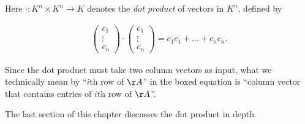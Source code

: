 \begin{theorem}
    Here $\cdot:K^n \times K^n \rightarrow K$ denotes the \textit{dot product} of vectors in $K^n$, defined by
    
    \begin{align*}
        \begin{pmatrix} c_1 \\ \vdots \\ c_n \end{pmatrix}
        \cdot
        \begin{pmatrix} c_1 \\ \vdots \\ c_n \end{pmatrix}
        =
        c_1 c_1 + ... + c_n c_n.
    \end{align*}
    
    Since the dot product must take two column vectors as input, what we technically mean by ``$i$th row of $\AA$'' in the boxed equation is ``column vector that contains entries of $i$th row of $\AA$''.
    
    The last section of this chapter discusses the dot product in depth.
\end{theorem}

